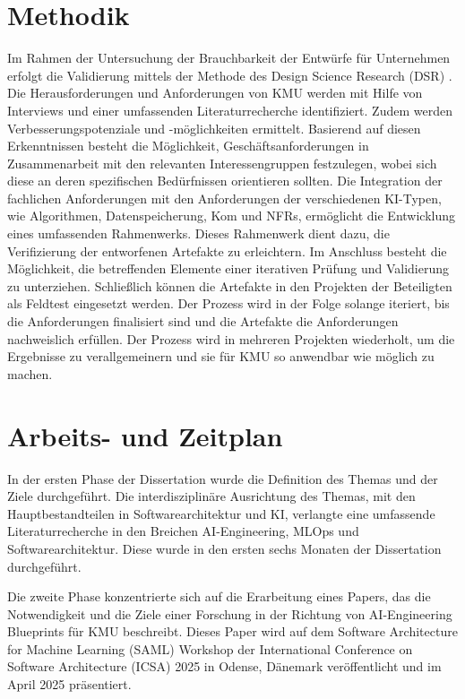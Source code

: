 \documentclass[11pt,a4paper,pointlessnumbers]{scrartcl}
\theoremstyle{break}
\numberwithin{equation}{section}
\begin{document}
\section{Methodik}
Im Rahmen der Untersuchung der Brauchbarkeit der Entwürfe für Unternehmen erfolgt die Validierung mittels der Methode des Design Science Research (DSR) \cite{hevnerDesignScienceInformation2004a, ivarssonMethodEvaluatingRigor2011}. Die Herausforderungen und Anforderungen von KMU werden mit Hilfe von Interviews und einer umfassenden Literaturrecherche identifiziert. Zudem werden Verbesserungspotenziale und -möglichkeiten ermittelt.  Basierend auf diesen Erkenntnissen besteht die Möglichkeit, Geschäftsanforderungen in Zusammenarbeit mit den relevanten Interessengruppen festzulegen, wobei sich diese an deren spezifischen Bedürfnissen orientieren sollten. Die Integration der fachlichen Anforderungen mit den Anforderungen der verschiedenen KI-Typen, wie Algorithmen, Datenspeicherung, Kom und NFRs, ermöglicht die Entwicklung eines umfassenden Rahmenwerks. Dieses Rahmenwerk dient dazu, die Verifizierung der entworfenen Artefakte zu erleichtern. Im Anschluss besteht die Möglichkeit, die betreffenden Elemente einer iterativen Prüfung und Validierung zu unterziehen. Schließlich können die Artefakte in den Projekten der Beteiligten als Feldtest eingesetzt werden. Der Prozess wird in der Folge solange iteriert, bis die Anforderungen finalisiert sind und die Artefakte die Anforderungen nachweislich erfüllen. Der Prozess wird in mehreren Projekten wiederholt, um die Ergebnisse zu verallgemeinern und sie für KMU so anwendbar wie möglich zu machen.

\section{Arbeits- und Zeitplan}
In der ersten Phase der Dissertation wurde die Definition des Themas und der Ziele durchgeführt. Die interdisziplinäre Ausrichtung des Themas, mit den Hauptbestandteilen in Softwarearchitektur und KI, verlangte eine umfassende Literaturrecherche in den Breichen AI-Engineering, MLOps und Softwarearchitektur. Diese wurde in den ersten sechs Monaten der Dissertation durchgeführt. 

Die zweite Phase konzentrierte sich auf die Erarbeitung eines Papers, das die Notwendigkeit und die Ziele einer Forschung in der Richtung von AI-Engineering Blueprints für KMU beschreibt. Dieses Paper wird auf dem Software Architecture for Machine Learning (SAML) Workshop der International Conference on Software Architecture (ICSA) 2025 in Odense, Dänemark veröffentlicht und im April 2025 präsentiert.   
\end{document}
